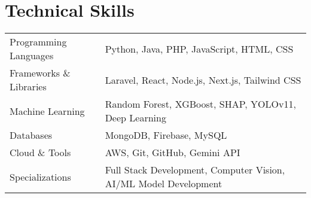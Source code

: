 \documentclass[a4paper,12pt]{article}
\begin{document}
\section{Technical Skills}
\begin{tabularx}{\linewidth}{@{}l X@{}}
Programming Languages & Python, Java, PHP, JavaScript, HTML, CSS \\[3pt]
Frameworks \& Libraries & Laravel, React, Node.js, Next.js, Tailwind CSS \\[3pt]
Machine Learning & Random Forest, XGBoost, SHAP, YOLOv11, Deep Learning \\[3pt]
Databases & MongoDB, Firebase, MySQL \\[3pt]
Cloud \& Tools & AWS, Git, GitHub, Gemini API \\[3pt]
Specializations & Full Stack Development, Computer Vision, AI/ML Model Development \\
\end{tabularx}

\vfill
{}
\end{document}
